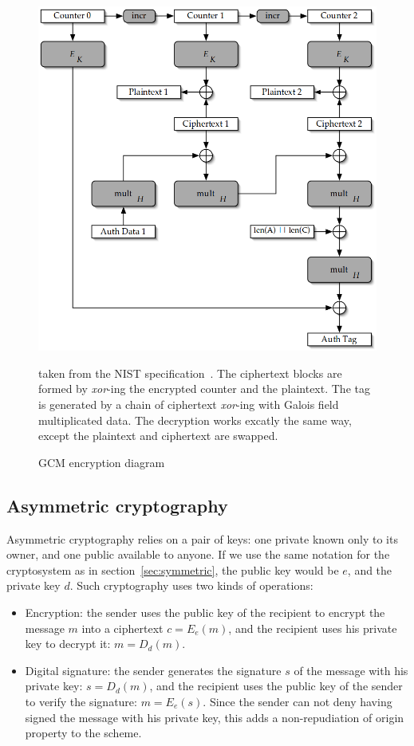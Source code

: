 \begin{figure}
\includegraphics[width=\textwidth]{nist-gcm-encrypt}
\caption{GCM encryption diagram}{taken from the NIST specification~\cite{mcgrew2005}. The ciphertext blocks are formed by \textit{xor}-ing the encrypted counter and the plaintext. The tag is generated by a chain of ciphertext \textit{xor}-ing with Galois field multiplicated data. The decryption works excatly the same way, except the plaintext and ciphertext are swapped.}
\label{fig:gcm-encrypt}
\end{figure}









\subsection{Asymmetric cryptography}
Asymmetric cryptography relies on a pair of keys: one private known only to its owner, and one public available to anyone.
If we use the same notation for the cryptosystem as in section~\ref{sec:symmetric}, the public key would be $e$, and the private key $d$.
Such cryptography uses two kinds of operations: 
\begin{itemize}
	\item Encryption: the sender uses the public key of the recipient to encrypt the message $m$ into a ciphertext $c = E_e(m)$, and the recipient uses his private key to decrypt it: $m = D_d(m)$.
	\item Digital signature: the sender generates the signature $s$ of the message with his private key: $s = D_d(m)$, and the recipient uses the public key of the sender to verify the signature: $m = E_e(s)$.
	Since the sender can not deny having signed the message with his private key, this adds a non-repudiation of origin property to the scheme.
\end{itemize}

